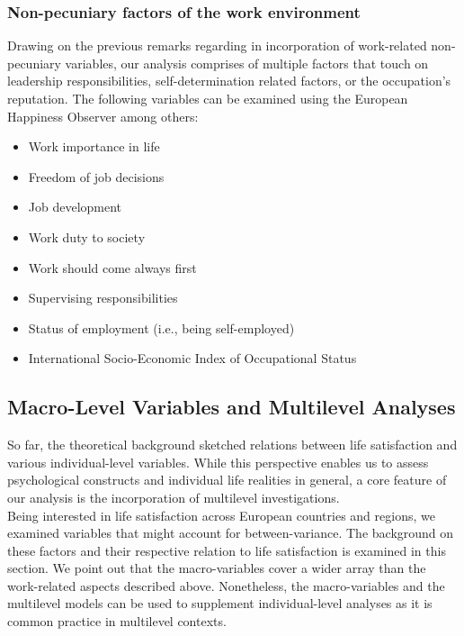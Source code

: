 \documentclass[preprint,12pt,authoryear]{elsarticle}
\begin{document}
\subsubsection{Non-pecuniary factors of the work environment}
Drawing on the previous remarks regarding in incorporation of work-related non-pecuniary variables, our analysis comprises of
multiple factors that touch on leadership responsibilities, self-determination related factors, or the occupation's reputation.
The following variables can be examined using the European Happiness Observer among others:
\begin{itemize}
   \item Work importance in life
   \item Freedom of job decisions
   \item Job development
   \item Work duty to society
   \item Work should come always first
   \item Supervising responsibilities 
   \item Status of employment (i.e., being self-employed)
   \item International Socio-Economic Index of Occupational Status   
\end{itemize}

\subsection{Macro-Level Variables and Multilevel Analyses}
So far, the theoretical background sketched relations between life satisfaction and various individual-level variables. While
this perspective enables us to assess psychological constructs and individual life realities in general, a core feature of our
analysis is the incorporation of multilevel investigations. \\
Being interested in life satisfaction across European countries and regions, we examined variables that might account for 
between-variance. The background on these factors and their respective relation to life satisfaction is examined in this 
section. We point out that the macro-variables cover a wider array than the work-related aspects described above. Nonetheless,
the macro-variables and the multilevel models can be used to supplement individual-level analyses as it is common practice
in multilevel contexts.
\end{document}
